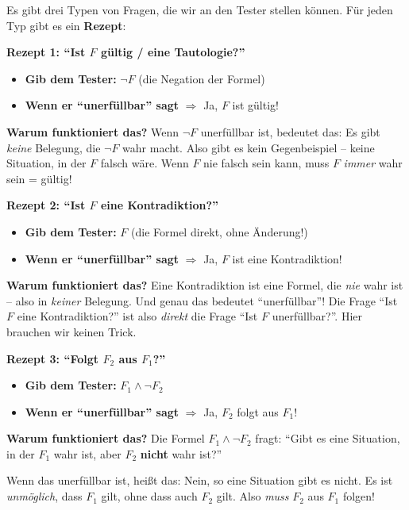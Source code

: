 \documentclass[a4paper,12pt]{article}
\begin{document}
Es gibt drei Typen von Fragen, die wir an den Tester stellen k\"onnen.
F\"ur jeden Typ gibt es ein \textbf{Rezept}:

\bigskip
\textbf{Rezept 1: "`Ist $F$ g\"ultig / eine Tautologie?"'}

\begin{itemize}
\item \textbf{Gib dem Tester:} $\neg F$ (die Negation der Formel)
\item \textbf{Wenn er "`unerf\"ullbar"' sagt} $\Rightarrow$ Ja, $F$ ist g\"ultig!
\end{itemize}

\textbf{Warum funktioniert das?}
Wenn $\neg F$ unerf\"ullbar ist, bedeutet das: Es gibt \emph{keine} Belegung,
die $\neg F$ wahr macht. Also gibt es kein Gegenbeispiel -- keine Situation, in
der $F$ falsch w\"are. Wenn $F$ nie falsch sein kann, muss $F$
\emph{immer} wahr sein = g\"ultig!

\bigskip
\textbf{Rezept 2: "`Ist $F$ eine Kontradiktion?"'}

\begin{itemize}
\item \textbf{Gib dem Tester:} $F$ (die Formel direkt, ohne \"Anderung!)
\item \textbf{Wenn er "`unerf\"ullbar"' sagt} $\Rightarrow$ Ja, $F$ ist eine Kontradiktion!
\end{itemize}

\textbf{Warum funktioniert das?}
Eine Kontradiktion ist eine Formel, die \emph{nie} wahr ist -- also in
\emph{keiner} Belegung. Und genau das bedeutet "`unerf\"ullbar"'! Die Frage
"`Ist $F$ eine Kontradiktion?"' ist also \emph{direkt} die Frage
"`Ist $F$ unerf\"ullbar?"'. Hier brauchen wir keinen Trick.

\bigskip
\textbf{Rezept 3: "`Folgt $F_2$ aus $F_1$?"'}

\begin{itemize}
\item \textbf{Gib dem Tester:} $F_1 \wedge \neg F_2$
\item \textbf{Wenn er "`unerf\"ullbar"' sagt} $\Rightarrow$ Ja, $F_2$ folgt aus $F_1$!
\end{itemize}

\textbf{Warum funktioniert das?}
Die Formel $F_1 \wedge \neg F_2$ fragt: "`Gibt es eine Situation, in der $F_1$
wahr ist, aber $F_2$ \textbf{nicht} wahr ist?"'

Wenn das unerf\"ullbar ist, hei\ss t das: Nein, so eine Situation gibt es nicht.
Es ist \emph{unm\"oglich}, dass $F_1$ gilt, ohne dass auch $F_2$ gilt.
Also \emph{muss} $F_2$ aus $F_1$ folgen!
\end{document}
